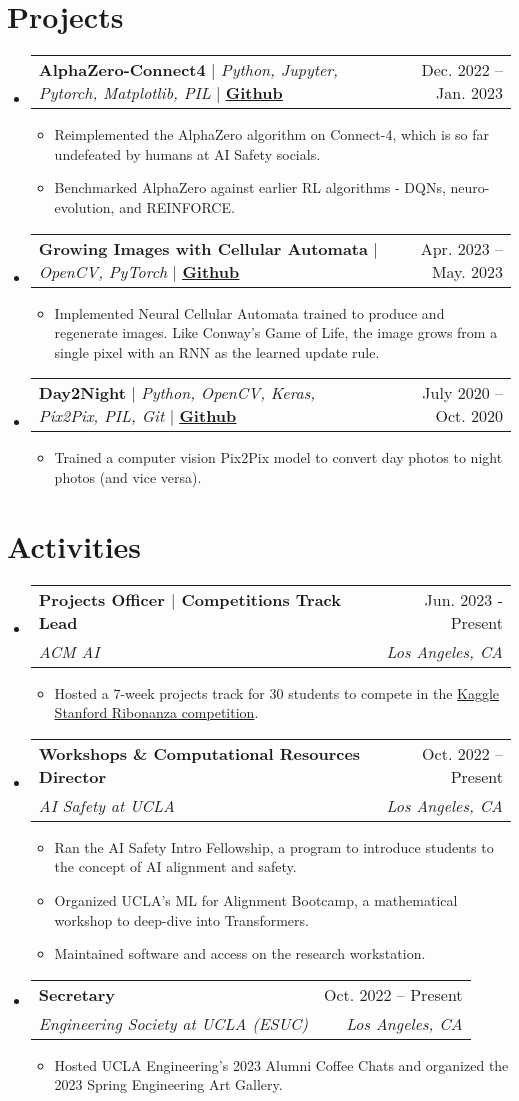 \documentclass[letterpaper,11pt]{article}
\makeatletter
\newcommand{\resumeItem}[1]{
  \item\small{
    {#1 \vspace{-2pt}}
  }
}
\newcommand{\resumeSubheading}[4]{
  \vspace{-2pt}\item
    \begin{tabular*}{0.97\textwidth}[t]{l@{\extracolsep{\fill}}r}
      \textbf{#1} & #2 \\
      \textit{\small#3} & \textit{\small #4} \\
    \end{tabular*}\vspace{-7pt}
}
\newcommand{\resumeProjectHeading}[2]{
    \item
    \begin{tabular*}{0.97\textwidth}{l@{\extracolsep{\fill}}r}
      \small#1 & #2 \\
    \end{tabular*}\vspace{-7pt}
}
\newcommand{\resumeSubHeadingListStart}{\begin{itemize}[leftmargin=0.15in, label={}]}
\newcommand{\resumeSubHeadingListEnd}{\end{itemize}}
\newcommand{\resumeItemListStart}{\begin{itemize}}
\newcommand{\resumeItemListEnd}{\end{itemize}\vspace{-5pt}}
\makeatother
\begin{document}
\section{Projects}
    \resumeSubHeadingListStart
      \resumeProjectHeading
          {\textbf{AlphaZero-Connect4} $|$ \emph{Python, Jupyter, Pytorch, Matplotlib, PIL} $|$ \underline{\textbf{\href{https://github.com/wz-ml/A0-Connect4}{Github}}}}{Dec. 2022 -- Jan. 2023}
          \resumeItemListStart
            \resumeItem{Reimplemented the AlphaZero algorithm on Connect-4, which is so far undefeated by humans at AI Safety socials.}
            \resumeItem{Benchmarked AlphaZero against earlier RL algorithms - DQNs, neuro-evolution, and REINFORCE.}
          \resumeItemListEnd
      \resumeProjectHeading
          {\textbf{Growing Images with Cellular Automata} $|$ \emph{OpenCV, PyTorch} $|$ \href{https://github.com/wz-ml/cellularimages}{\underline{\textbf{Github}}}}{Apr. 2023 -- May. 2023}
          \resumeItemListStart
            \resumeItem{Implemented Neural Cellular Automata trained to produce and regenerate images. Like Conway's Game of Life, the image grows from a single pixel with an RNN as the learned update rule.}
          \resumeItemListEnd
      \resumeProjectHeading
          {\textbf{Day2Night} $|$ \emph{Python, OpenCV, Keras, Pix2Pix, PIL, Git} $|$ \href{https://github.com/wz-ml/Day2Night-with-Pix2Pix}{\underline{\textbf{Github}}}}{July 2020 -- Oct. 2020}
          \resumeItemListStart
            \resumeItem{Trained a computer vision Pix2Pix model to convert day photos to night photos (and vice versa).}
          \resumeItemListEnd
    \resumeSubHeadingListEnd


\section{Activities}
    \resumeSubHeadingListStart
    \resumeSubheading
      {Projects Officer $\vert$ Competitions Track Lead} {Jun. 2023 - Present}
      {ACM AI}{Los Angeles, CA}
      \resumeItemListStart
            \resumeItem{Hosted a 7-week projects track for 30 students to compete in the \href{https://www.kaggle.com/competitions/stanford-ribonanza-rna-folding}{Kaggle Stanford Ribonanza competition}.}
      \resumeItemListEnd
    
    \resumeSubheading
      {Workshops \& Computational Resources Director}{Oct. 2022 – Present}
      {AI Safety at UCLA}{Los Angeles, CA}
      \resumeItemListStart
            \resumeItem{Ran the AI Safety Intro Fellowship, a program to introduce students to the concept of AI alignment and safety.}
            \resumeItem{Organized UCLA's ML for Alignment Bootcamp, a mathematical workshop to deep-dive into Transformers.}
            \resumeItem{Maintained software and access on the research workstation.}
      \resumeItemListEnd

    \resumeSubheading
      {Secretary}{Oct. 2022 – Present}
      {Engineering Society at UCLA (ESUC)}{Los Angeles, CA}
      \resumeItemListStart
            \resumeItem{Hosted UCLA Engineering's 2023 Alumni Coffee Chats and organized the 2023 Spring Engineering Art Gallery.}
      \resumeItemListEnd
    \resumeSubHeadingListEnd
    

\end{document}
